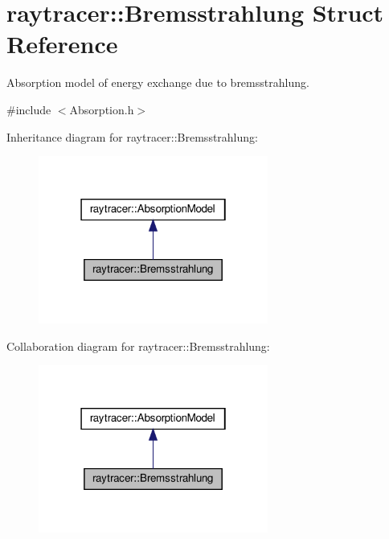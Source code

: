 \hypertarget{structraytracer_1_1Bremsstrahlung}{}\section{raytracer\+:\+:Bremsstrahlung Struct Reference}
\label{structraytracer_1_1Bremsstrahlung}


Absorption model of energy exchange due to bremsstrahlung.  




{\ttfamily \#include $<$Absorption.\+h$>$}



Inheritance diagram for raytracer\+:\+:Bremsstrahlung\+:
\nopagebreak
\begin{figure}[H]
\begin{center}
\leavevmode
\includegraphics[width=214pt]{structraytracer_1_1Bremsstrahlung__inherit__graph}
\end{center}
\end{figure}


Collaboration diagram for raytracer\+:\+:Bremsstrahlung\+:
\nopagebreak
\begin{figure}[H]
\begin{center}
\leavevmode
\includegraphics[width=214pt]{structraytracer_1_1Bremsstrahlung__coll__graph}
\end{center}
\end{figure}
